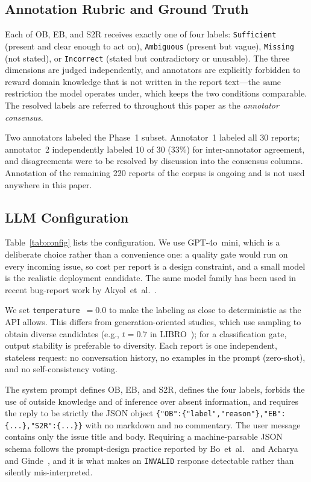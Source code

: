 \subsection{Annotation Rubric and Ground Truth}
\label{sec:method:groundtruth}

Each of OB, EB, and S2R receives exactly one of four labels:
\texttt{Sufficient} (present and clear enough to act on),
\texttt{Ambiguous} (present but vague), \texttt{Missing} (not stated),
or \texttt{Incorrect} (stated but contradictory or unusable). The three
dimensions are judged independently, and annotators are explicitly
forbidden to reward domain knowledge that is not written in the report
text---the same restriction the model operates under, which keeps the
two conditions comparable. The resolved labels are referred to
throughout this paper as the \emph{annotator consensus}.

Two annotators labeled the Phase~1 subset. Annotator~1 labeled all 30
reports; annotator~2 independently labeled 10 of 30 (33\%) for
inter-annotator agreement, and disagreements were to be resolved by
discussion into the consensus columns. Annotation of the remaining 220
reports of the corpus is ongoing and is not used anywhere in this
paper.

\subsection{LLM Configuration}
\label{sec:method:llm}

Table~\ref{tab:config} lists the configuration. We use GPT-4o~mini,
which is a deliberate choice rather than a convenience one: a quality
gate would run on every incoming issue, so cost per report is a design
constraint, and a small model is the realistic deployment candidate.
The same model family has been used in recent bug-report work by
Akyol~et~al.~\cite{akyol2026improbr}.

We set \texttt{temperature}~$=0.0$ to make the labeling as close to
deterministic as the API allows. This differs from generation-oriented
studies, which use sampling to obtain diverse candidates
(e.g., $t=0.7$ in LIBRO~\cite{kang2024libro}); for a classification
gate, output stability is preferable to diversity. Each report is one
independent, stateless request: no conversation history, no examples in
the prompt (zero-shot), and no self-consistency voting.

The system prompt defines OB, EB, and S2R, defines the four labels,
forbids the use of outside knowledge and of inference over absent
information, and requires the reply to be strictly the JSON object
\texttt{\{"OB":\{"label","reason"\},"EB":\{...\},"S2R":\{...\}\}} with
no markdown and no commentary. The user message contains only the issue
title and body. Requiring a machine-parsable JSON schema follows the
prompt-design practice reported by Bo~et~al.~\cite{bo2024chatbr} and
Acharya and Ginde~\cite{acharya2025enhance}, and it is what makes an
\texttt{INVALID} response detectable rather than silently
mis-interpreted.

